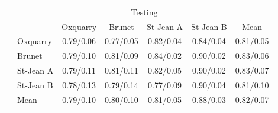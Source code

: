 \begin{table}[!t]
  \vspace{0.5cm}

  \begin{tabular}{l l| c c c c|c}
    \toprule
    \multicolumn{2}{c}{\multirow{2}{*}{}} & \multicolumn{4}{c}{Testing} \\
    \multicolumn{2}{c}{} & Oxquarry & Brunet & St-Jean A & St-Jean B & Mean \\
    \midrule
    \parbox[!t]{2mm}{}
    & Oxquarry  & 0.79/0.06 & 0.77/0.05 & 0.82/0.04 & 0.84/0.04 & 0.81/0.05 \\
    & Brunet    & 0.79/0.10 & 0.81/0.09 & 0.84/0.02 & 0.90/0.02 & 0.83/0.06 \\
    & St-Jean A & 0.79/0.11 & 0.81/0.11 & 0.82/0.05 & 0.90/0.02 & 0.83/0.07 \\
    & St-Jean B & 0.78/0.13 & 0.79/0.14 & 0.77/0.09 & 0.90/0.04 & 0.81/0.10 \\
    \midrule
    & Mean      & 0.79/0.10 & 0.80/0.10 & 0.81/0.05 & 0.88/0.03 & 0.82/0.07 \\
    \bottomrule
  \end{tabular}

\end{table}
